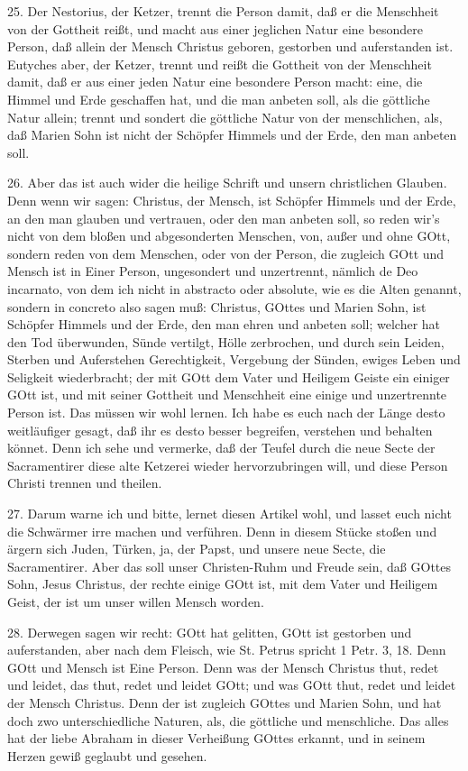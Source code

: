25. Der Nestorius, der Ketzer, trennt die Person damit, daß er die Menschheit von der Gottheit reißt, und macht aus einer jeglichen Natur eine besondere Person, daß allein der Mensch Christus geboren, gestorben und auferstanden ist. Eutyches aber, der Ketzer, trennt und reißt die Gottheit von der Menschheit damit, daß er aus einer jeden Natur eine besondere Person macht: eine, die Himmel und Erde geschaffen hat, und die man anbeten soll, als die göttliche Natur allein; trennt und sondert die göttliche Natur von der menschlichen, als, daß Marien Sohn ist nicht der Schöpfer Himmels und der Erde, den man anbeten soll.

26. Aber das ist auch wider die heilige Schrift und unsern christlichen Glauben. Denn wenn wir sagen: Christus, der Mensch, ist Schöpfer Himmels und der Erde, an den man glauben und vertrauen, oder den man anbeten soll, so reden wir’s nicht von dem bloßen und abgesonderten Menschen, von, außer und ohne GOtt, sondern reden von dem Menschen, oder von der Person, die zugleich GOtt und Mensch ist in Einer Person, ungesondert und unzertrennt, nämlich de Deo incarnato, von dem ich nicht in abstracto oder absolute, wie es die Alten genannt, sondern in concreto also sagen muß: Christus, GOttes und Marien Sohn, ist Schöpfer Himmels und der Erde, den man ehren und anbeten soll; welcher hat den Tod überwunden, Sünde vertilgt, Hölle zerbrochen, und durch sein Leiden, Sterben und Auferstehen Gerechtigkeit, Vergebung der Sünden, ewiges Leben und Seligkeit wiederbracht; der mit GOtt dem Vater und Heiligem Geiste ein einiger GOtt ist, und mit seiner Gottheit und Menschheit eine einige und unzertrennte Person ist. Das müssen wir wohl lernen. Ich habe es euch nach der Länge desto weitläufiger gesagt, daß ihr es desto besser begreifen, verstehen und behalten könnet. Denn ich sehe und vermerke, daß der Teufel durch die neue Secte der Sacramentirer diese alte Ketzerei wieder hervorzubringen will, und diese Person Christi trennen und theilen.

27. Darum warne ich und bitte, lernet diesen Artikel wohl, und lasset euch nicht die Schwärmer irre machen und verführen. Denn in diesem Stücke stoßen und ärgern sich Juden, Türken, ja, der Papst, und unsere neue Secte, die Sacramentirer. Aber das soll unser Christen-Ruhm und Freude sein, daß GOttes Sohn, Jesus Christus, der rechte einige GOtt ist, mit dem Vater und Heiligem Geist, der ist um unser willen Mensch worden.

28. Derwegen sagen wir recht: GOtt hat gelitten, GOtt ist gestorben und auferstanden, aber nach dem Fleisch, wie St. Petrus spricht 1 Petr. 3, 18. Denn GOtt und Mensch ist Eine Person. Denn was der Mensch Christus thut, redet und leidet, das thut, redet und leidet GOtt; und was GOtt thut, redet und leidet der Mensch Christus. Denn der ist zugleich GOttes und Marien Sohn, und hat doch zwo unterschiedliche Naturen, als, die göttliche und menschliche. Das alles hat der liebe Abraham in dieser Verheißung GOttes erkannt, und in seinem Herzen gewiß geglaubt und gesehen.

